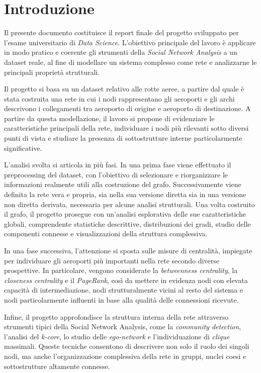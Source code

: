 {}
\chapter*{Introduzione}

Il presente documento costituisce il report finale del progetto sviluppato per l’esame universitario di \textit{Data Science}. L’obiettivo principale del lavoro è applicare in modo pratico e coerente gli strumenti della \textit{Social Network Analysis} a un dataset reale, al fine di modellare un sistema complesso come rete e analizzarne le principali proprietà strutturali.

Il progetto si basa su un dataset relativo alle rotte aeree, a partire dal quale è stata costruita una rete in cui i nodi rappresentano gli aeroporti e gli archi descrivono i collegamenti tra aeroporto di origine e aeroporto di destinazione. A partire da questa modellazione, il lavoro si propone di evidenziare le caratteristiche principali della rete, individuare i nodi più rilevanti sotto diversi punti di vista e studiare la presenza di sottostrutture interne particolarmente significative.

L’analisi svolta si articola in più fasi. In una prima fase viene effettuato il preprocessing del dataset, con l’obiettivo di selezionare e riorganizzare le informazioni realmente utili alla costruzione del grafo. Successivamente viene definita la rete vera e propria, sia nella sua versione diretta sia in una versione non diretta derivata, necessaria per alcune analisi strutturali. Una volta costruito il grafo, il progetto prosegue con un’analisi esplorativa delle sue caratteristiche globali, comprendente statistiche descrittive, distribuzioni dei gradi, studio delle componenti connesse e visualizzazioni della struttura complessiva.

In una fase successiva, l’attenzione si sposta sulle misure di centralità, impiegate per individuare gli aeroporti più importanti nella rete secondo diverse prospettive. In particolare, vengono considerate la \textit{betweenness centrality}, la \textit{closeness centrality} e il \textit{PageRank}, così da mettere in evidenza nodi con elevata capacità di intermediazione, nodi strutturalmente vicini al resto del sistema e nodi particolarmente influenti in base alla qualità delle connessioni ricevute.

Infine, il progetto approfondisce la struttura interna della rete attraverso strumenti tipici della Social Network Analysis, come la \textit{community detection}, l’analisi del \textit{k-core}, lo studio delle \textit{ego-network} e l’individuazione di \textit{clique} massimali. Queste tecniche consentono di descrivere non solo il ruolo dei singoli nodi, ma anche l’organizzazione complessiva della rete in gruppi, nuclei coesi e sottostrutture altamente connesse.

